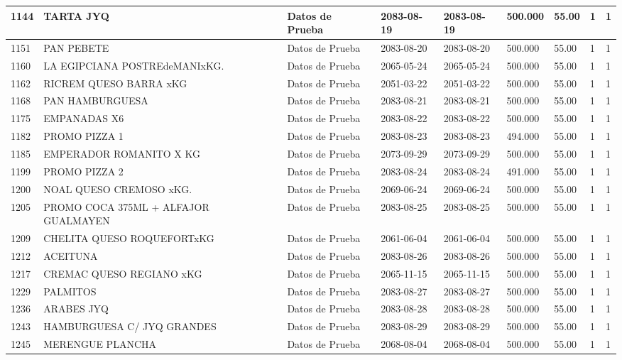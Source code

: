 \documentclass[a4paper,12pt]{article}
\begin{document}
\begin{landscape}
\begin{longtable}{|p{4cm}|p{2.5cm}|p{2.5cm}|p{1.8cm}|p{1.8cm}|p{1cm}|p{1cm}|p{3cm}|p{3cm}||}
1144 & TARTA JYQ & Datos de Prueba & 2083-08-19 & 2083-08-19 & 500.000 & 55.00 & 1 & 1 \\ \hline 
1151 & PAN PEBETE & Datos de Prueba & 2083-08-20 & 2083-08-20 & 500.000 & 55.00 & 1 & 1 \\ \hline 
1160 & LA EGIPCIANA POSTREdeMANIxKG. & Datos de Prueba & 2065-05-24 & 2065-05-24 & 500.000 & 55.00 & 1 & 1 \\ \hline 
1162 & RICREM QUESO BARRA xKG & Datos de Prueba & 2051-03-22 & 2051-03-22 & 500.000 & 55.00 & 1 & 1 \\ \hline 
1168 & PAN HAMBURGUESA & Datos de Prueba & 2083-08-21 & 2083-08-21 & 500.000 & 55.00 & 1 & 1 \\ \hline 
1175 & EMPANADAS X6 & Datos de Prueba & 2083-08-22 & 2083-08-22 & 500.000 & 55.00 & 1 & 1 \\ \hline 
1182 & PROMO PIZZA 1 & Datos de Prueba & 2083-08-23 & 2083-08-23 & 494.000 & 55.00 & 1 & 1 \\ \hline 
1185 & EMPERADOR ROMANITO X KG & Datos de Prueba & 2073-09-29 & 2073-09-29 & 500.000 & 55.00 & 1 & 1 \\ \hline 
1199 & PROMO PIZZA 2 & Datos de Prueba & 2083-08-24 & 2083-08-24 & 491.000 & 55.00 & 1 & 1 \\ \hline 
1200 & NOAL QUESO CREMOSO xKG. & Datos de Prueba & 2069-06-24 & 2069-06-24 & 500.000 & 55.00 & 1 & 1 \\ \hline 
1205 & PROMO COCA 375ML  + ALFAJOR GUALMAYEN & Datos de Prueba & 2083-08-25 & 2083-08-25 & 500.000 & 55.00 & 1 & 1 \\ \hline 
1209 & CHELITA QUESO ROQUEFORTxKG & Datos de Prueba & 2061-06-04 & 2061-06-04 & 500.000 & 55.00 & 1 & 1 \\ \hline 
1212 & ACEITUNA & Datos de Prueba & 2083-08-26 & 2083-08-26 & 500.000 & 55.00 & 1 & 1 \\ \hline 
1217 & CREMAC QUESO REGIANO xKG & Datos de Prueba & 2065-11-15 & 2065-11-15 & 500.000 & 55.00 & 1 & 1 \\ \hline 
1229 & PALMITOS & Datos de Prueba & 2083-08-27 & 2083-08-27 & 500.000 & 55.00 & 1 & 1 \\ \hline 
1236 & ARABES JYQ & Datos de Prueba & 2083-08-28 & 2083-08-28 & 500.000 & 55.00 & 1 & 1 \\ \hline 
1243 & HAMBURGUESA C/ JYQ GRANDES & Datos de Prueba & 2083-08-29 & 2083-08-29 & 500.000 & 55.00 & 1 & 1 \\ \hline 
1245 & MERENGUE PLANCHA & Datos de Prueba & 2068-08-04 & 2068-08-04 & 500.000 & 55.00 & 1 & 1 \\ \hline 

\end{longtable}
\end{landscape}
\end{document}
